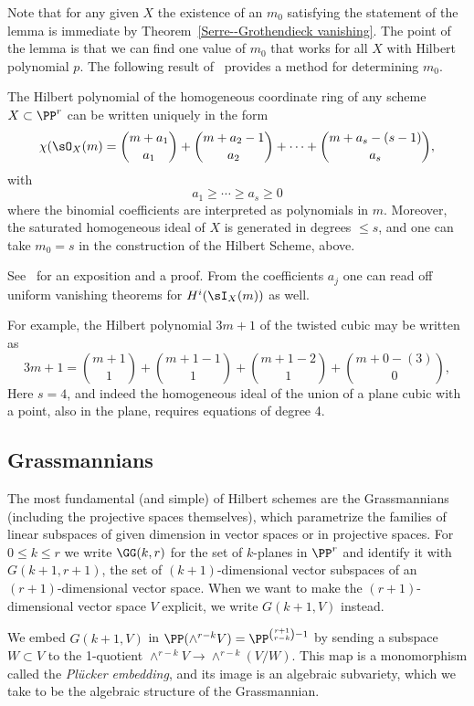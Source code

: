 Note that  for any given $X$ the existence of an $m_0$ satisfying the
statement of the lemma is immediate by
Theorem~\ref{Serre--Grothendieck vanishing}. The point of the lemma is
that we can find one value of $m_0$ that works for all $X$ with
Hilbert polynomial $p$. The following result of~\cite{Gotzmann}
provides a method for determining $m_0$.

\begin{theorem}
The Hilbert polynomial  of the homogeneous coordinate ring of any scheme $X\subset \PP^r$ can be written uniquely in the form
$$
\chi(\sO_X(m) = {m+a_1\choose a_1}+ {m+a_2 -1\choose a_2}+ \cdots+{m+a_s -(s-1)\choose a_s},
$$
with 
$$
a_1\geq \cdots \geq a_s \geq 0
$$
where the binomial coefficients are interpreted as polynomials in $m$. Moreover, the saturated homogeneous ideal of $X$ is
 generated in degrees $\leq s$, and one can take $m_0 = s$ in the construction of the Hilbert Scheme, above.
\end{theorem}

See~\cite{MR1023391} %
for an exposition and a proof. From the coefficients $a_j$ one can read off uniform vanishing theorems for $H^i(\sI_X(m))$
 as well.
 
 For example, the Hilbert polynomial $3m+1$ of the twisted cubic may be written as
 $$
 3m+1 =  {m+1\choose 1}+ {m+1 -1\choose 1}+{m+1 -2\choose 1}+{m+0 -(3)\choose 0},
 $$
 Here $s=4$, and indeed the homogeneous ideal of the union of a plane cubic with a point, also in the plane,
 requires equations of degree 4.
 
 \subsection{Grassmannians}\label{Grassmannian section}
 
 The most fundamental (and simple) of Hilbert schemes are the Grassmannians (including the projective spaces themselves), which parametrize the families of linear subspaces of given dimension in vector spaces or in projective spaces.
For $0\leq k\leq r$ we write $\GG(k,r)$ for the set of $k$-planes in $\PP^{r}$ and identify it with
$G(k+1,r+1)$, the set of $(k+1)$-dimensional vector subspaces of an $(r+1)$-dimensional vector space.
When we want to make the $(r+1)$-dimensional vector space $V$ explicit, we write $G(k+1, V)$ instead.

We embed $G(k+1,V)$ in $\PP(\wedge^{r-k}V) = \PP^{\binom{r+1}{r-k}-1}$ by sending a subspace $W\subset V$ to the 1-quotient $\wedge^{r-k}V \to \wedge^{r-k}(V/W)$. This map is a monomorphism called the \emph{Pl\"ucker embedding}, and its image is an algebraic subvariety, which we take to be the algebraic structure
of the Grassmannian. 


